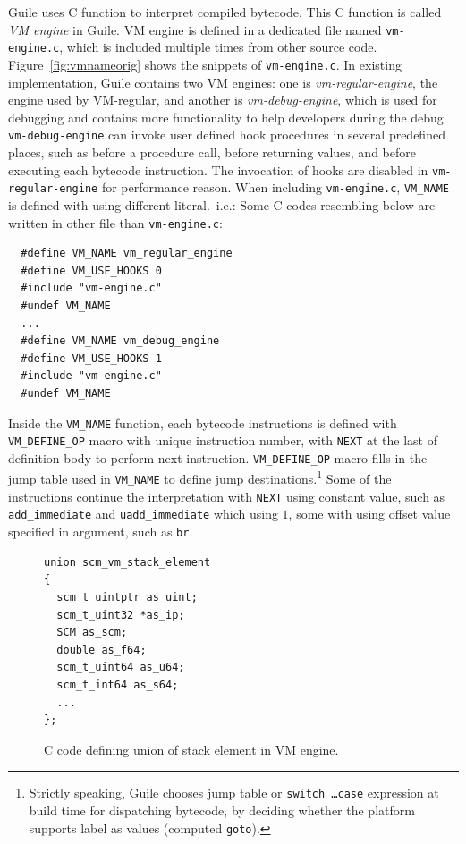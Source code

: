 \documentclass[preprint]{sigplanconf}
\begin{document}
Guile uses C function to interpret compiled bytecode. This C function is called
\textit{VM engine} in Guile. VM engine is defined in a dedicated file named
\texttt{vm-engine.c}, which is included multiple times from other source
code. Figure~\hyperref[fig:vmnameorig]{\ref{fig:vmnameorig}} shows the snippets
of \texttt{vm-engine.c}. In existing implementation, Guile contains two VM
engines: one is \textit{vm-regular-engine}, the engine used by VM-regular, and
another is \textit{vm-debug-engine}, which is used for debugging and contains
more functionality to help developers during the debug. \texttt{vm-debug-engine}
can invoke user defined hook procedures in several predefined places, such as
before a procedure call, before returning values, and before executing each
bytecode instruction. The invocation of hooks are disabled in
\texttt{vm-regular-engine} for performance reason. When including
\texttt{vm-engine.c}, \texttt{VM\_NAME} is defined with using different
literal.\ i.e.: Some C codes resembling below are written in other file than
\texttt{vm-engine.c}:

\begin{verbatim}
  #define VM_NAME vm_regular_engine
  #define VM_USE_HOOKS 0
  #include "vm-engine.c"
  #undef VM_NAME
  ...
  #define VM_NAME vm_debug_engine
  #define VM_USE_HOOKS 1
  #include "vm-engine.c"
  #undef VM_NAME
\end{verbatim}

Inside the \texttt{VM\_NAME} function, each bytecode instructions is defined
with \texttt{VM\_DEFINE\_OP} macro with unique instruction number, with
\texttt{NEXT} at the last of definition body to perform next
instruction. \texttt{VM\_DEFINE\_OP} macro fills in the jump table used in
\texttt{VM\_NAME} to define jump destinations.\footnote{Strictly speaking, Guile
  chooses jump table or \texttt{switch \ldots\@ case} expression at build time for
  dispatching bytecode, by deciding whether the platform supports label as
  values (computed \texttt{goto}).}  Some of the instructions continue the
interpretation with \texttt{NEXT} using constant value, such as
\texttt{add\_immediate} and \texttt{uadd\_immediate} which using $1$, some with
using offset value specified in argument, such as \texttt{br}.

\begin{figure}
\begin{verbatim}
union scm_vm_stack_element
{
  scm_t_uintptr as_uint;
  scm_t_uint32 *as_ip;
  SCM as_scm;
  double as_f64;
  scm_t_uint64 as_u64;
  scm_t_int64 as_s64;
  ...
};
\end{verbatim}
\caption{C code defining union of stack element in VM engine.}
\label{fig:stackelem}
\end{figure}
\end{document}
